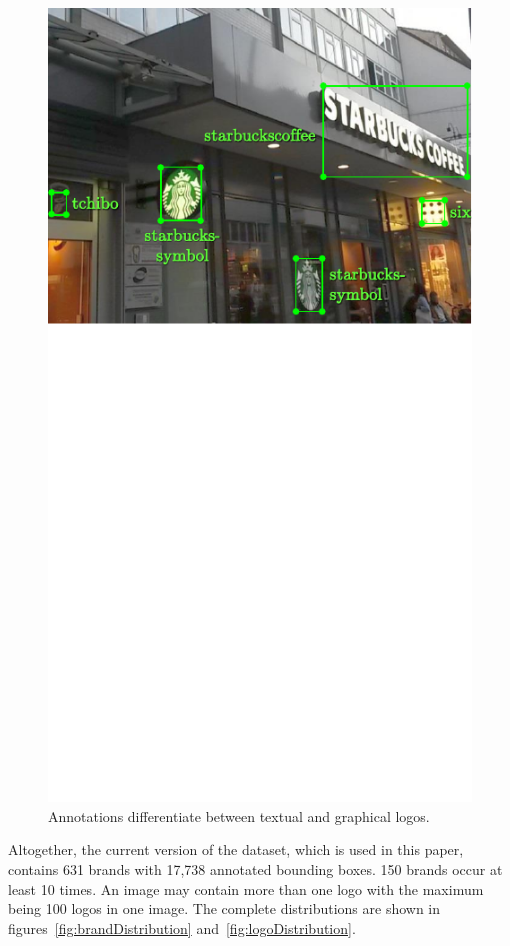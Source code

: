 \documentclass[a4paper,twoside]{article}
\begin{document}
\begin{figure}%
\centering%
\includegraphics[width=\linewidth, trim=0cm 9cm 0cm 0cm, clip]{img/annotatedSample.pdf}%
\caption{Annotations differentiate between textual and graphical logos.}%
\label{fig:annotatedSample}
\end{figure}%
%
Altogether, the current version of the dataset, which is used in this paper, contains 631 brands with 17,738 annotated bounding boxes. 150 brands occur at least 10 times. An image may contain more than one logo with the maximum being 100 logos in one image. The complete distributions are shown in figures~\ref{fig:brandDistribution} and~\ref{fig:logoDistribution}. 
\end{document}
